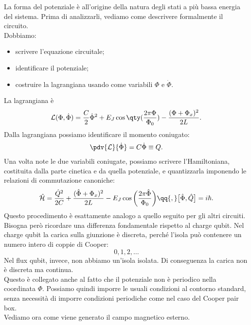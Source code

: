 La forma del potenziale è all'origine della natura degli stati a più bassa energia del sistema. Prima di analizzarli, vediamo come descrivere formalmente il circuito.\\
Dobbiamo:
\begin{itemize}[leftmargin=0.5cm]
    \item scrivere l'equazione circuitale;
    \item identificare il potenziale;
    \item costruire la lagrangiana usando come variabili $\Phi$ e $\dot{\Phi}$.
\end{itemize}
La lagrangiana è
\begin{equation*}
    \mathcal{L}(\Phi,\dot{\Phi})
    =
    \frac{C}{2}\dot{\Phi}^2
    +
    E_J \cos{
        \qty(
            \frac{2\pi\Phi}{\Phi_0}
        )
    }
    -
    \frac{(\Phi+\Phi_x)^2}{2L}.
\end{equation*}
Dalla lagrangiana possiamo identificare il momento coniugato:
\begin{equation*}
    \pdv{\mathcal{L}}{\dot{\Phi}}
    =
    C\dot{\Phi}
    \equiv
    Q.
\end{equation*}
Una volta note le due variabili coniugate, possiamo scrivere l'Hamiltoniana, costituita dalla parte cinetica e da quella potenziale, e quantizzarla imponendo le relazioni di commutazione canoniche:
\begin{equation*}
    \hat{\mathcal{H}}
    =
    \frac{\hat{Q}^2}{2C}
    +
    \frac{(\hat{\Phi}+\Phi_x)^2}{2L}
    -
    E_J
    \cos{
        \biggl(
            \frac{2\pi\hat{\Phi}}{\Phi_0}
        \biggr)
    }
    \qq{,}
    \bigl[
        \hat{\Phi},
        \hat{Q}
    \bigr]
    =
    i\hbar.
\end{equation*}
Questo procedimento è esattamente analogo a quello seguito per gli altri circuiti.\\
Bisogna però ricordare una differenza fondamentale rispetto al charge qubit. Nel charge qubit la carica sulla giunzione è discreta, perché l'isola può contenere un numero intero di coppie di Cooper:
\[
0,1,2,\ldots
\]
Nel flux qubit, invece, non abbiamo un'isola isolata. Di conseguenza la carica non è discreta ma continua.\\
Questo è collegato anche al fatto che il potenziale non è periodico nella coordinata $\Phi$. Possiamo quindi imporre le usuali condizioni al contorno standard, senza necessità di imporre condizioni periodiche come nel caso del Cooper pair box.\\
Vediamo ora come viene generato il campo magnetico esterno.
